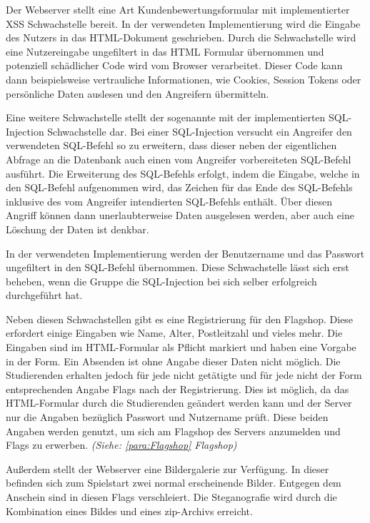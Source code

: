 Der Webserver stellt eine Art Kundenbewertungsformular mit implementierter XSS Schwachstelle bereit. In der verwendeten Implementierung wird die Eingabe des Nutzers in das HTML-Dokument geschrieben. Durch die Schwachstelle wird eine Nutzereingabe ungefiltert in das HTML Formular übernommen und potenziell schädlicher Code wird vom Browser verarbeitet. Dieser Code kann dann beispielsweise vertrauliche Informationen, wie Cookies, Session Tokens oder persönliche Daten auslesen und den Angreifern übermitteln. \cite{ruettenSicherheitWebanwendungen2007}

Eine weitere Schwachstelle stellt der sogenannte  mit der implementierten SQL-Injection Schwachstelle dar. 
Bei einer SQL-Injection versucht ein Angreifer den verwendeten SQL-Befehl so zu erweitern, dass dieser neben der eigentlichen Abfrage an die Datenbank auch einen vom Angreifer vorbereiteten SQL-Befehl ausführt. Die Erweiterung des SQL-Befehls erfolgt, indem die Eingabe, welche in den SQL-Befehl aufgenommen wird, das Zeichen für das Ende des SQL-Befehls inklusive des vom Angreifer intendierten SQL-Befehls enthält. Über diesen Angriff können dann unerlaubterweise Daten ausgelesen werden, aber auch eine Löschung der Daten ist denkbar.\cite{bachfeldGiftspritze2004}

In der verwendeten Implementierung werden der Benutzername und das Passwort ungefiltert in den SQL-Befehl übernommen. Diese Schwachstelle lässt sich erst beheben, wenn die Gruppe die SQL-Injection bei sich selber erfolgreich durchgeführt hat.

Neben diesen Schwachstellen gibt es eine Registrierung für den Flagshop. Diese erfordert einige Eingaben wie Name, Alter, Postleitzahl und vieles mehr. Die Eingaben sind im HTML-Formular als Pflicht markiert und haben eine Vorgabe in der Form. Ein Absenden ist ohne Angabe dieser Daten nicht möglich. Die Studierenden erhalten jedoch für jede nicht getätigte und für jede nicht der Form entsprechenden Angabe Flags nach der Registrierung. Dies ist möglich, da das HTML-Formular durch die Studierenden geändert werden kann und der Server nur die Angaben bezüglich Passwort und Nutzername prüft. Diese beiden Angaben werden genutzt, um sich am Flagshop des Servers anzumelden und Flags zu erwerben. \textit{(Siehe: \ref{para:Flagshop} Flagshop)}

Außerdem stellt der Webserver eine Bildergalerie zur Verfügung. In dieser befinden sich zum Spielstart zwei normal erscheinende Bilder. Entgegen dem Anschein sind in diesen Flags verschleiert. Die Steganografie wird durch die Kombination eines Bildes und eines zip-Archivs erreicht.\cite{abtsUeberarbeitungUndErweiterung2016}